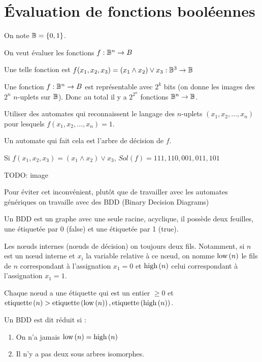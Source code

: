 \section{Évaluation de fonctions booléennes}

\begin{notation}
	On note $\mathbb{B} = \left\{0,1\right\}$.
\end{notation}

On veut évaluer les fonctions $f : \mathbb{B} ^ n \to B$

\begin{exemple}
	Une telle fonction est $f(x_1,x_2,x_3) = (x_1 \land x_2) \lor x_3 : \mathbb{B}^3 \to \mathbb{B}$
\end{exemple}

Une fonction $f : \mathbb{B} ^ n \to B$ est représentable avec $2^k$ bits
(on donne les images des $2^n$ $n$-uplets sur $\mathbb{B}$).
Donc au total il y a $2^{2^n}$ fonctions $\mathbb{B}^n \to \mathbb{B}$.

\begin{idee}
	Utiliser des automates qui reconnaissent le langage des $n$-uplets
	$(x_1,x_2,\ldots, x_n)$ pour lesquels $f(x_1, x_2, \ldots, x_n) = 1$.
\end{idee}

Un automate qui fait cela est l'arbre de décision de $f$.

\begin{exemple}
	Si $f(x_1,x_2,x_3) = (x_1 \land x_2) \lor x_3$, $Sol(f) = 111,110,001,011,101$

	TODO: image
\end{exemple}


Pour éviter cet inconvénient, plutôt que de travailler avec les automates génériques
on travaille avec des BDD (Binary Decision Diagrams)

\begin{definition}
	Un BDD est un graphe avec une seule racine, acyclique, il possède deux feuilles,
	une étiquetée par 0 (false) et une étiquetée par 1 (true).

	Les nœuds internes (nœuds de décision) on toujours deux fils. Notamment, si $n$ est un nœud interne
	et $x_i$ la variable relative à ce nœud, on nomme $\text{low}\left(n\right)$ le fils de $n$ correspondant à l'assignation
	$x_1 = 0$ et $\text{high}\left(n\right)$ celui correspondant à l'assignation $x_1 = 1$.

	Chaque nœud a une étiquette qui est un entier $\geq 0$ et $\text{etiquette}\left(n\right) > \text{etiquette}\left(\text{low}\left(n\right)\right),  \text{etiquette}\left(\text{high}\left(n\right)\right)$.
\end{definition}


\begin{definition}
	Un BDD est dit réduit si :
	\begin{enumerate}
		\item On n'a jamais $\text{low}\left(n\right) = \text{high}\left(n\right)$
		\item Il n'y a pas deux sous arbres isomorphes.
	\end{enumerate}
\end{definition}

